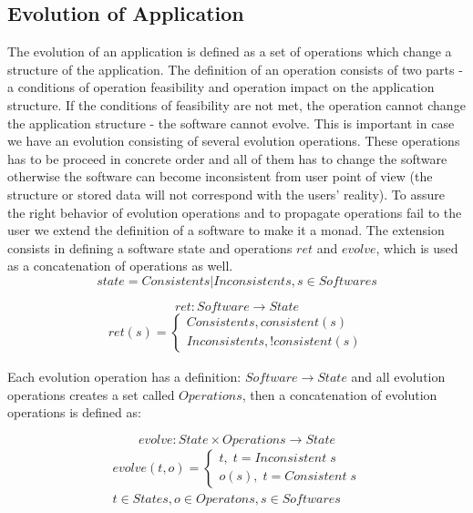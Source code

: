 \documentclass[11pt]{article}
\begin{document}
\subsection{Evolution of Application}
\label{sec:appEvolution}

The evolution of an application is defined as a set of operations which change a structure of the application. The definition of an operation consists of two parts - a conditions of operation feasibility and operation impact on the application structure. If the conditions of feasibility are not met, the operation cannot change the application structure - the software cannot evolve. This is important in case we have an evolution consisting of several evolution operations. These operations has to be proceed in concrete order and all of them has to change the software otherwise the software can become inconsistent from user point of view (the structure or stored data will not correspond with the users' reality). To assure the right behavior of evolution operations and to propagate operations fail to the user we extend the definition of a software to make it a monad. The extension consists in defining a software state and operations $ret$ and $evolve$, which is used as a concatenation of operations as well.
$$state = Consistent s | Inconsistent s, s \in Softwares$$

$$ret : Software \rightarrow State $$
\begin{equation*}
\begin{gathered}
	ret(s) = \begin{cases}
 Consistent s, consistent(s)
 \\
 Inconsistent s, ! consistent(s)
 \end{cases}
\end{gathered}
\end{equation*}

Each evolution operation has a definition: $Software \rightarrow State$ and all evolution operations creates a set called $Operations$, then a concatenation of evolution operations is defined as:

$$evolve : State \times Operations \rightarrow State  $$
\begin{equation*}
\begin{gathered}
 evolve(t, o) = \begin{cases}
 t, \; t = Inconsistent \; s \\
 o(s), \; t = Consistent \; s 
\end{cases}\\ 
t \in States, o \in Operatons, s \in Softwares
\end{gathered}
\end{equation*}
\end{document}
